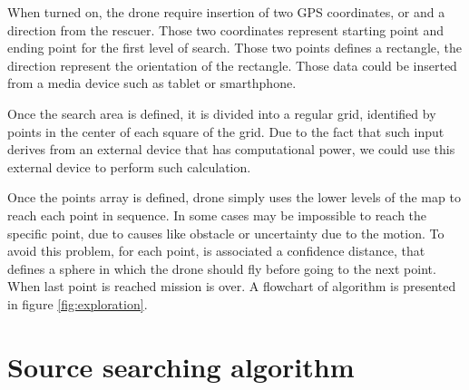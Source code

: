 \begin{figure}[p]
\end{figure}

When turned on, the drone require insertion of two GPS coordinates, or  and a direction from the rescuer. Those two coordinates represent starting point and ending point for the first level of search. Those two points defines a rectangle, the direction represent the orientation of the rectangle. Those data could be inserted from a media device such as tablet or smarthphone.

Once the search area is defined, it is divided into a regular grid, identified by points in the center of each square of the grid. Due to the fact that such input derives from an external device that has computational power, we could use this external device to perform such calculation.

Once the points array is defined, drone simply uses the lower levels of the map to reach each point in sequence. In some cases may be impossible to reach the specific point, due to causes like obstacle or uncertainty due to the motion. To avoid this problem, for each point, is associated a confidence distance, that defines a sphere in which the drone should fly before going to the next point. When last point is reached mission is over. A flowchart of algorithm is presented in figure \ref{fig:exploration}.


\section{Source searching algorithm}


